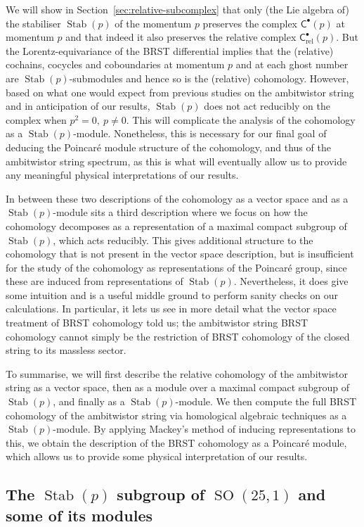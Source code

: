 \documentclass[11pt,reqno,a4paper,final]{amsart}
\theoremstyle{plain}
\theoremstyle{definition}
\newcommand{\sC}{\mathsf{C}}
\newcommand{\Crel}{\mathsf{C}_{\mathrm{rel}}} %
\newcommand{\Stab}{\operatorname{Stab}}
\newcommand{\1}{\mathbb{1}}
\newcommand{\SO}{\operatorname{SO}}
\numberwithin{equation}{section}
\begin{document}
We will show in Section~\ref{sec:relative-subcomplex} that only (the
Lie algebra of) the stabiliser $\Stab(p)$ of the momentum $p$
preserves the complex $\sC^\bullet(p)$ at momentum $p$ and that indeed
it also preserves the relative complex $\Crel^\bullet(p)$. But the
Lorentz-equivariance of the BRST differential implies that the
(relative) cochains, cocycles and coboundaries at momentum $p$ and at
each ghost number are $\Stab(p)$-submodules and hence so is the
(relative) cohomology. However, based on what one would expect from
previous studies on the ambitwistor string and in anticipation of our
results, $\Stab(p)$ does not act reducibly on the complex when
$p^2=0,\ p\neq 0$. This will complicate the analysis of the cohomology
as a $\Stab(p)$-module. Nonetheless, this is necessary for our final
goal of deducing the Poincaré module structure of the cohomology, and
thus of the ambitwistor string spectrum, as this is what will
eventually allow us to provide any meaningful physical interpretations
of our results.

In between these two descriptions of the cohomology as a vector space
and as a $\Stab(p)$-module sits a third description where we focus on
how the cohomology decomposes as a representation of a maximal compact
subgroup of $\Stab(p)$, which acts reducibly. This gives additional
structure to the cohomology that is not present in the vector space
description, but is insufficient for the study of the cohomology as
representations of the Poincaré group, since these are induced from
representations of $\Stab(p)$.  Nevertheless, it does give some
intuition and is a useful middle ground to perform sanity checks on
our calculations. In particular, it lets us see in more detail what
the vector space treatment of BRST cohomology told us; the ambitwistor
string BRST cohomology cannot simply be the restriction of BRST
cohomology of the closed string to its massless sector.

To summarise, we will first describe the relative cohomology of the
ambitwistor string as a vector space, then as a module over a
maximal compact subgroup of $\Stab(p)$, and finally as a
$\Stab(p)$-module. We then compute the full BRST cohomology of the
ambitwistor string via homological algebraic techniques as a
$\Stab(p)$-module. By applying Mackey's method of inducing
representations to this, we obtain the description of the BRST
cohomology as a Poincaré module, which allows us to provide some
physical interpretation of our results.


\subsection{The $\Stab(p)$ subgroup of $\SO(25,1)$ and some of its modules}
\label{sec:stabp-reps}
\end{document}

